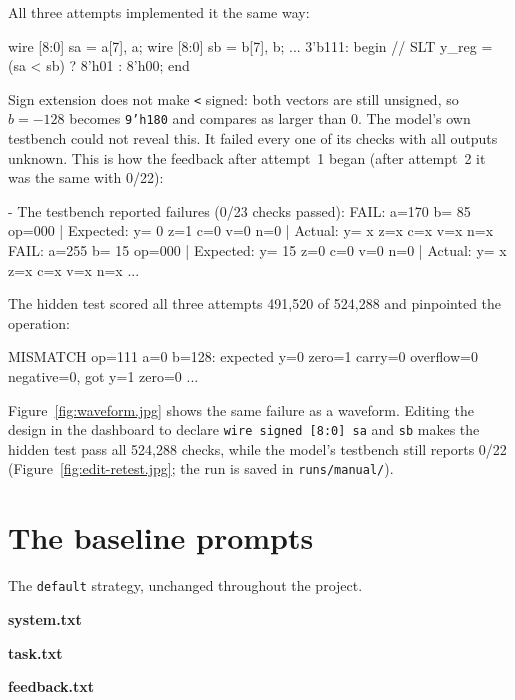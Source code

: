 \documentclass[11pt,a4paper]{article}
\begin{document}
All three attempts implemented it the same way:

\begin{code}
wire [8:0] sa = {a[7], a};
wire [8:0] sb = {b[7], b};
...
3'b111: begin // SLT
    y_reg = (sa < sb) ? 8'h01 : 8'h00;
end
\end{code}

Sign extension does not make \texttt{<} signed: both vectors are still unsigned, so $b = -128$ becomes
\texttt{9'h180} and compares as larger than 0. The model's own testbench could not reveal this. It failed every one
of its checks with all outputs unknown. This is how the feedback after attempt~1 began (after attempt~2 it was the
same with 0/22):

\begin{code}
- The testbench reported failures (0/23 checks passed):
FAIL: a=170 b= 85 op=000 | Expected: y=  0 z=1 c=0 v=0 n=0 | Actual: y=  x z=x c=x v=x n=x
FAIL: a=255 b= 15 op=000 | Expected: y= 15 z=0 c=0 v=0 n=0 | Actual: y=  x z=x c=x v=x n=x
...
\end{code}

The hidden test scored all three attempts 491,520 of 524,288 and pinpointed the operation:

\begin{code}
MISMATCH op=111 a=0 b=128: expected y=0 zero=1 carry=0 overflow=0 negative=0, got y=1 zero=0 ...
\end{code}

Figure~\ref{fig:waveform.jpg} shows the same failure as a waveform. Editing the design in the dashboard to declare
\texttt{wire signed [8:0] sa} and \texttt{sb} makes the hidden test pass all 524,288 checks, while the model's
testbench still reports 0/22 (Figure~\ref{fig:edit-retest.jpg}; the run is saved in \texttt{runs/manual/}).

\section{The baseline prompts}

The \texttt{default} strategy, unchanged throughout the project.

\textbf{system.txt}

\textbf{task.txt}

\textbf{feedback.txt}
\end{document}
